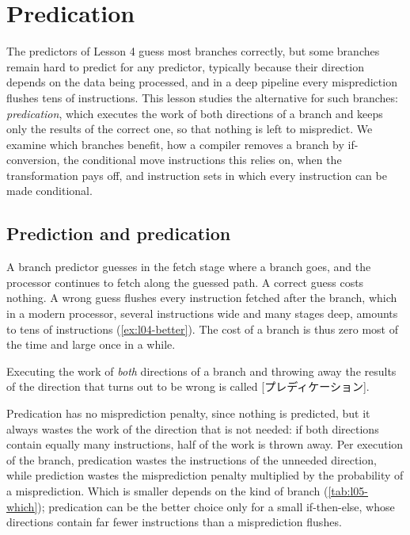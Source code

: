 \documentclass[../main.tex]{subfiles}
\begin{document}
\chapter{Predication}

The predictors of Lesson 4 guess most branches correctly, but some branches
remain hard to predict for any predictor, typically because their direction
depends on the data being processed, and in a deep pipeline every
misprediction flushes tens of instructions.  This lesson studies the
alternative for such branches: \emph{predication}, which executes the work of
both directions of a branch and keeps only the results of the correct one, so
that nothing is left to mispredict.  We examine which branches benefit, how a
compiler removes a branch by if-conversion, the conditional move instructions
this relies on, when the transformation pays off, and instruction sets in
which every instruction can be made conditional.

\section{Prediction and predication}
\label{sec:l05-predication}

A branch predictor guesses in the fetch stage where a branch goes, and the
processor continues to fetch along the guessed path.  A correct guess costs nothing.  A wrong guess flushes every
instruction fetched after the branch, which in a modern processor, several
instructions wide and many stages deep, amounts to tens of instructions
(\cref{ex:l04-better}).  The cost of a branch is thus zero most of the time
and large once in a while.

\begin{definition}[Predication]
  \label{def:l05-predication}
  Executing the work of \emph{both} directions of a branch and throwing away
  the results of the direction that turns out to be wrong is called
  [プレディケーション].
\end{definition}

Predication has no misprediction penalty, since nothing is predicted, but it
always wastes the work of the direction that is not needed: if both
directions contain equally many instructions, half of the work is thrown
away.  Per
execution of the branch, predication wastes the instructions of the unneeded
direction, while prediction wastes the misprediction penalty
multiplied by the probability of a misprediction.  Which is smaller depends
on the kind of branch (\cref{tab:l05-which}); predication can be the better
choice only for a small if-then-else, whose directions contain far fewer
instructions than a misprediction flushes.
\end{document}
